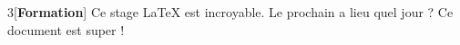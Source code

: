     \setlength{\columnseprule}{0.4pt}
    \begin{multicols}{3}[\textbf{Formation}]
    \raggedcolumns
        Ce stage \LaTeX{} est incroyable.
        Le prochain a lieu quel jour ? Ce
        document est super !
    \end{multicols}
